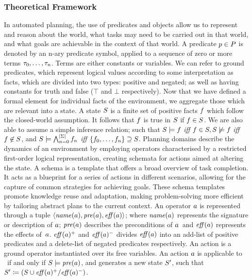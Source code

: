 \subsubsection{Theoretical Framework} 
In automated planning, the use of predicates and objects allow us to represent and reason about the world, what tasks may need to be carried out in that world, and what goals are achievable in the context of that world.
A predicate $p\in P$ is denoted by an n-ary predicate symbol, applied to a sequence of zero or more terms $\tau_0,\dots,\tau_n$. Terms are either constants or variables. We can refer to ground predicates, which represent logical values according to some interpretation as facts, which are divided into two types: positive and negated; as well as having constants for truth and false ($\top$ and $\bot$ respectively).
Now that we have defined a formal element for individual facts of the environment, we aggregate those which are relevant into a state.
A state $S$ is a finite set of positive facts $f$ which follow the closed-world assumption. It follows that $f$ is true in $S$ if $f\in S$. We are also able to assume a simple inference relation; such that $S\models f$ \textit{iff} $f\in S,S\not\models f$ \textit{iff} $f\not\in S$, and $S\models\bigwedge^{\left\lvert \Sigma \right\rvert}_{n=0}f_n$ \textit{iff} $\left\{f_0,\dots,f_n\right\}\supseteq S$.
Planning domains describe the dynamics of an environment by employing operators characterised by a restricted first-order logical representation, creating schemata for actions aimed at altering the state. A schema is a template that offers a broad overview of task completion. It acts as a blueprint for a series of actions in different scenarios, allowing for the capture of common strategies for achieving goals. These schema templates promote knowledge reuse and adaptation, making problem-solving more efficient by tailoring abstract plans to the current context.
An operator $a$ is represented through a tuple $\left\langle\mathit{name}(a),\mathit{pre}(a),\mathit{eff}(a)\right\rangle$; where $\mathit{name}(a)$ represents the signature or description of $a$; $\mathit{pre}(a)$ describes the preconditions of $a$~and $\mathit{eff}(a)$ represents the effects of~$a$. $\mathit{eff}(a)^+$ and $\mathit{eff}(a)^-$ divides $\mathit{eff}(a)$ into an add-list of positive predicates and a delete-list of negated predicates respectively. An action is a ground operator instantiated over its free variables. 
An action $a$ is applicable to \states~if and only if $S\models\mathit{pre}(a)$, and generates a new state $S'$, such that $S'\coloneqq(S\cup\mathit{eff}(a)^+/\mathit{eff}(a)^-)$. 
